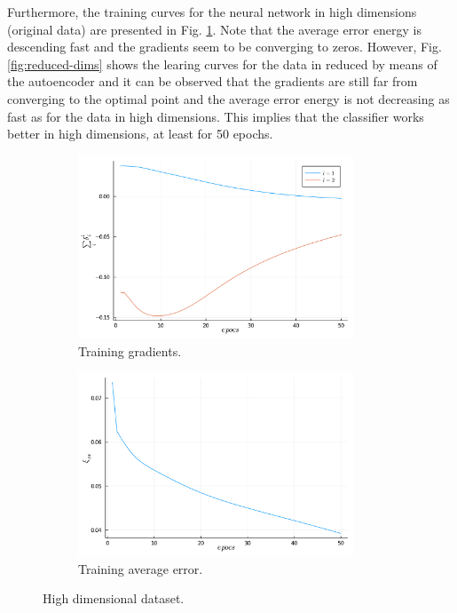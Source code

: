 \documentclass[conference]{IEEEtran}
\theoremstyle{definition}
\theoremstyle{remark}
\theoremstyle{remark}
\begin{document}
Furthermore, the training curves for the neural network in high dimensions
(original data) are presented in Fig. \ref{fig:high-dims}. Note that the average
error energy is descending fast and the gradients seem to be converging to
zeros. However, Fig. \ref{fig:reduced-dims} shows the learing curves for the
data in reduced by means of the autoencoder and it can be observed that the
gradients are still far from converging to the optimal point and the average
error energy is not decreasing as fast as for the data in high dimensions. This
implies that the classifier works better in high dimensions, at least for 50
epochs.

\begin{figure}
  \centering
  \begin{subfigure}[b]{0.45\textwidth}
    \centering \includegraphics[width=0.9\textwidth]{figs/grads-learn-data.pdf}
    \caption{Training gradients.}
  \end{subfigure}
  \begin{subfigure}[b]{0.45\textwidth}
    \centering
    \includegraphics[width=0.9\textwidth]{figs/avg-err-learn-data.pdf}
    \caption{Training average error.}
  \end{subfigure}
  \caption{High dimensional dataset.}
  \label{fig:high-dims}
\end{figure}
\end{document}
